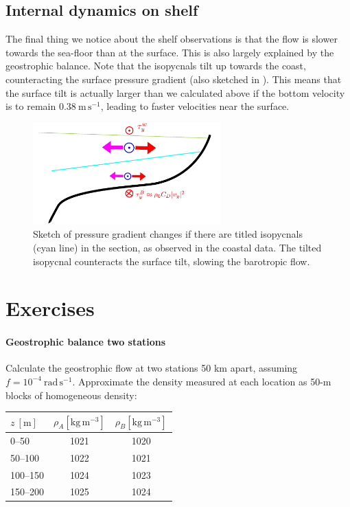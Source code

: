 \subsection{Internal dynamics on shelf}

The final thing we notice about the shelf observations is that the  flow is slower towards the sea-floor than at the surface.  This is also largely explained by the geostrophic balance.  Note that the isopycnals tilt up towards the coast, counteracting the surface pressure gradient (also sketched in ).  This means that the surface tilt is actually larger than we calculated above if the bottom velocity is to remain $0.38\ \mathrm{m\,s^{-1}}$, leading to faster velocities near the surface.  

\begin{figure}[hbt]
  \begin{center}
    \includegraphics[width=2.85in]{figs/Geostrophic/CoastalTilt}
        \caption{Sketch of pressure gradient changes if there are titled isopycnals (cyan line) in the section, as observed in the coastal data.  The tilted isopycnal counteracts the surface tilt, slowing the barotropic flow.  }
    \label{fig:CoastalTilt}  
  \end{center}
\end{figure}

\clearpage
\section{Exercises}

\paragraph{Geostrophic balance two stations}

Calculate the geostrophic flow at two stations 50 km apart, assuming $f=10^{-4}\ \mathrm{rad\,s^{-1}}$.  
Approximate the density measured at each location as 50-m blocks of homogeneous density:

\begin{tabular}{l|cc}
  $z\ \mathrm{[m]}$ & $\rho_A \mathrm{[kg\,m^{-3}]}$ & $\rho_B \mathrm{[kg\,m^{-3}]}$ \\
  \hline
  0--50 & 1021& 1020 \\
  50--100& 1022& 1021\\
  100--150& 1024& 1023\\
  150--200& 1025& 1024\\  
\end{tabular}

